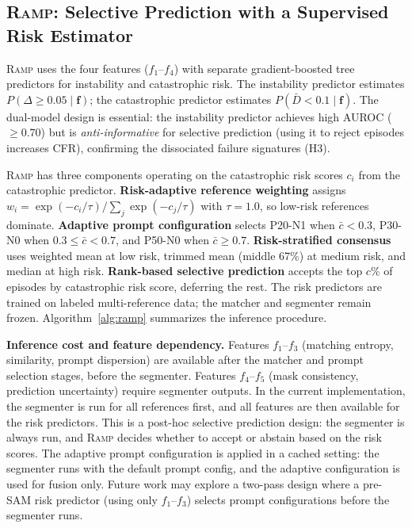 \documentclass[10pt,twocolumn,letterpaper]{article}
\newcommand{\RAMP}{\textsc{Ramp}}
\begin{document}
\subsection{\RAMP: Selective Prediction with a Supervised Risk Estimator}

\RAMP{} uses the four features ($f_1$--$f_4$) with separate
gradient-boosted tree predictors for instability and catastrophic risk. The
instability predictor estimates $P(\Delta \geq 0.05 \mid \mathbf{f})$; the
catastrophic predictor estimates $P(\bar{D} < 0.1 \mid \mathbf{f})$. The
dual-model design is essential: the instability predictor achieves high
AUROC ($\geq 0.70$) but is \emph{anti-informative} for selective prediction
(using it to reject episodes increases CFR), confirming the
dissociated failure signatures (H3).

\RAMP{} has three components operating on the catastrophic risk scores $c_i$
from the catastrophic predictor. \textbf{Risk-adaptive reference weighting}
assigns $w_i = \exp(-c_i / \tau) / \sum_j \exp(-c_j / \tau)$ with
$\tau=1.0$, so low-risk references dominate. \textbf{Adaptive prompt
configuration} selects P20-N1 when $\bar{c} < 0.3$, P30-N0 when $0.3 \leq
\bar{c} < 0.7$, and P50-N0 when $\bar{c} \geq 0.7$. \textbf{Risk-stratified
consensus} uses weighted mean at low risk, trimmed mean (middle 67\%) at
medium risk, and median at high risk. \textbf{Rank-based selective
prediction} accepts the top $c\%$ of episodes by catastrophic risk score,
deferring the rest. The risk predictors are trained on labeled multi-reference
data; the matcher and segmenter remain frozen. Algorithm~\ref{alg:ramp}
summarizes the inference procedure.

\medskip\noindent
\textbf{Inference cost and feature dependency.}
Features $f_1$--$f_3$ (matching entropy, similarity, prompt dispersion) are
available after the matcher and prompt selection stages, before the
segmenter. Features $f_4$--$f_5$ (mask consistency, prediction uncertainty)
require segmenter outputs. In the current implementation, the segmenter is
run for all references first, and all features are then available for the
risk predictors. This is a post-hoc selective prediction design: the
segmenter is always run, and \RAMP{} decides whether to accept or abstain
based on the risk scores. The adaptive prompt configuration is applied in a
cached setting: the segmenter runs with the default prompt config, and the
adaptive configuration is used for fusion only. Future work may explore a
two-pass design where a pre-SAM risk predictor (using only $f_1$--$f_3$)
selects prompt configurations before the segmenter runs.
\end{document}
